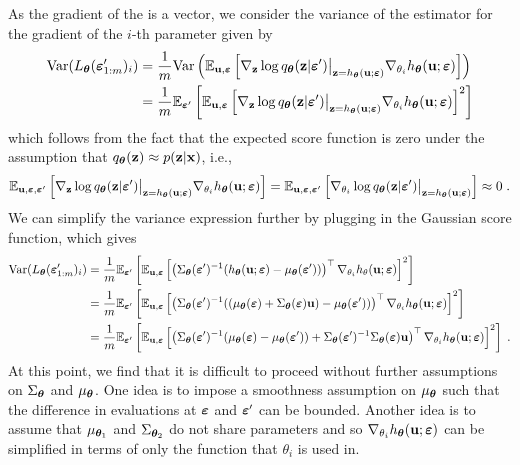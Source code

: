 \documentclass[10pt]{article}
\begin{document}
As the gradient of the \elbo is a vector, we consider the variance of the estimator for the gradient of the $i$-th parameter given by
\begin{align*}
\mathrm{Var}(L_{\bm{\theta}}(\bm{\varepsilon}_{1:m}')_i) &= \frac{1}{m}\mathrm{Var}\left(\mathbb{E}_{\mathbf{u},\bm{\varepsilon}}\left[\nabla_{\mathbf{z}}\log q_{\bm{\theta}}(\mathbf{z}|\bm{\varepsilon}')\big|_{\mathbf{z}=h_{\bm{\theta}}(\mathbf{u};\bm{\varepsilon})} \nabla_{\theta_i} h_{\bm{\theta}}(\mathbf{u};\bm{\varepsilon})\right]\right) \\
&= \frac{1}{m}\mathbb{E}_{\bm{\varepsilon}'}\left[\mathbb{E}_{\mathbf{u},\bm{\varepsilon}}\left[\nabla_{\mathbf{z}}\log q_{\bm{\theta}}(\mathbf{z}|\bm{\varepsilon}')\big|_{\mathbf{z}=h_{\bm{\theta}}(\mathbf{u};\bm{\varepsilon})} \nabla_{\theta_i} h_{\bm{\theta}}(\mathbf{u};\bm{\varepsilon})\right]^2\right]
\end{align*}
which follows from the fact that the expected score function is zero under the assumption that $q_{\bm{\theta}}(\mathbf{z})\approx p(\mathbf{z}|\mathbf{x})$, i.e.,
\[
\mathbb{E}_{\mathbf{u},\bm{\varepsilon},\bm{\varepsilon}'}\left[\nabla_{\mathbf{z}}\log q_{\bm{\theta}}(\mathbf{z}|\bm{\varepsilon}')\big|_{\mathbf{z}=h_{\bm{\theta}}(\mathbf{u};\bm{\varepsilon})} \nabla_{\theta_i} h_{\bm{\theta}}(\mathbf{u};\bm{\varepsilon})\right] = \mathbb{E}_{\mathbf{u},\bm{\varepsilon},\bm{\varepsilon}'}\left[\nabla_{\theta_i}\log q_{\bm{\theta}}(\mathbf{z}|\bm{\varepsilon}')\big|_{\mathbf{z}=h_{\bm{\theta}}(\mathbf{u};\bm{\varepsilon})}\right] \approx 0 \;.
\]
We can simplify the variance expression further by plugging in the Gaussian score function, which gives
\begin{align*}
\mathrm{Var}(L_{\bm{\theta}}(\bm{\varepsilon}_{1:m}')_i) &= \frac{1}{m}\mathbb{E}_{\bm{\varepsilon}'}\left[\mathbb{E}_{\mathbf{u},\bm{\varepsilon}}\left[\left(\Sigma_{\bm{\theta}}(\bm{\varepsilon}')^{-1}(h_{\bm{\theta}}(\mathbf{u};\bm{\varepsilon})-\mu_{\bm{\theta}}(\bm{\varepsilon}'))\right)^\top\nabla_{\theta_i} h_\theta(\mathbf{u};\bm{\varepsilon})\right]^2\right] \\
&= \frac{1}{m}\mathbb{E}_{\bm{\varepsilon}'}\left[\mathbb{E}_{\mathbf{u},\bm{\varepsilon}}\left[\left(\Sigma_{\bm{\theta}}(\bm{\varepsilon}')^{-1}(\left(\mu_{\bm{\theta}}(\bm{\varepsilon})+\Sigma_{\bm{\theta}}(\bm{\varepsilon})\mathbf{u}\right)-\mu_{\bm{\theta}}(\bm{\varepsilon}'))\right)^\top\nabla_{\theta_i} h_{\bm{\theta}}(\mathbf{u};\bm{\varepsilon})\right]^2\right] \\
&= \frac{1}{m}\mathbb{E}_{\bm{\varepsilon}'}\left[\mathbb{E}_{\mathbf{u},\bm{\varepsilon}}\left[\left(\Sigma_{\bm{\theta}}(\bm{\varepsilon}')^{-1}(\mu_{\bm{\theta}}(\bm{\varepsilon})-\mu_{\bm{\theta}}(\bm{\varepsilon}'))+\Sigma_{\bm{\theta}}(\bm{\varepsilon}')^{-1}\Sigma_{\bm{\theta}}(\bm{\varepsilon})\mathbf{u}\right)^\top\nabla_{\theta_i} h_{\bm{\theta}}(\mathbf{u};\bm{\varepsilon})\right]^2\right] \;.
\end{align*}
At this point, we find that it is difficult to proceed without further assumptions on $\Sigma_{\bm{\theta}}$ and $\mu_{\bm{\theta}}$. One idea is to impose a smoothness assumption on $\mu_{\bm{\theta}}$ such that the difference in evaluations at $\bm{\varepsilon}$ and $\bm{\varepsilon}'$ can be bounded. Another idea is to assume that $\mu_{{\bm{\theta}}_1}$ and $\Sigma_{{\bm{\theta}}_2}$ do not share parameters and so $\nabla_{\theta_i}h_{\bm{\theta}}(\mathbf{u};\bm{\varepsilon})$ can be simplified in terms of only the function that $\theta_i$ is used in.
\\
\end{document}
